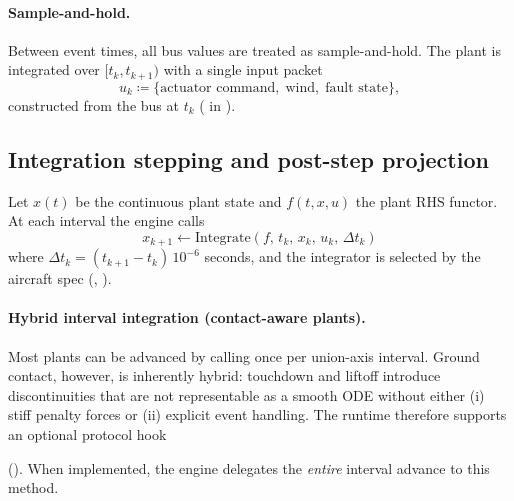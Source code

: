 \paragraph{Sample-and-hold.}\label{sec:runtime-sample-hold}
Between event times, all bus values are treated as sample-and-hold. The plant is integrated over $[t_k, t_{k+1})$ with a single input packet
\begin{equation}
  u_k \coloneqq \{\text{actuator command},\; \text{wind},\; \text{fault state}\},
\end{equation}
constructed from the bus at $t_k$ ( in ).


\subsection{Integration stepping and post-step projection}

Let $x(t)$ be the continuous plant state and $f(t, x, u)$ the plant RHS functor. At each interval the engine calls
\begin{equation}
  x_{k+1} \gets \mathrm{Integrate}(f,\, t_k,\, x_k,\, u_k,\, \Delta t_k)
\end{equation}
where $\Delta t_k = (t_{k+1}-t_k)\,10^{-6}$ seconds, and the integrator is selected by the aircraft spec (, ).

\paragraph{Hybrid interval integration (contact-aware plants).}
\label{sec:runtime-hybrid-integrators}
Most plants can be advanced by calling  once per union-axis interval. Ground contact, however, is inherently hybrid: touchdown and liftoff introduce discontinuities that are not representable as a smooth ODE without either (i) stiff penalty forces or (ii) explicit event handling. The runtime therefore supports an optional protocol hook
\begin{quote}\small
{}
\end{quote}
(). When implemented, the engine delegates the \emph{entire} interval advance to this method.

